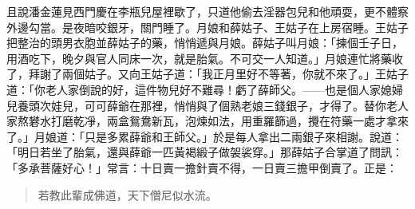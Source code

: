 且說潘金蓮見西門慶在李瓶兒屋裡歇了，只道他偷去淫器包兒和他頑耍，更不體察外邊勾當。是夜暗咬銀牙，關門睡了。月娘和薛姑子、王姑子在上房宿睡。王姑子把整治的頭男衣胞並薛姑子的藥，悄悄遞與月娘。薛姑子叫月娘：「揀個壬子日，用酒吃下，晚夕與官人同床一次，就是胎氣。不可交一人知道。」月娘連忙將藥收了，拜謝了兩個姑子。又向王姑子道：「我正月里好不等著，你就不來了。」王姑子道：「你老人家倒說的好，這件物兒好不難尋！虧了薛師父。——也是個人家媳婦兒養頭次娃兒，可可薛爺在那裡，悄悄與了個熟老娘三錢銀子，才得了。替你老人家熬礬水打磨乾凈，兩盒鴛鴦新瓦，泡煉如法，用重羅篩過，攪在符藥一處才拿來了。」月娘道：「只是多累薛爺和王師父。」於是每人拿出二兩銀子來相謝。說道：「明日若坐了胎氣，還與薛爺一匹黃褐緞子做袈裟穿。」那薛姑子合掌道了問訊：「多承菩薩好心！」常言：十日賣一擔針賣不得，一日賣三擔甲倒賣了。正是：
\begin{quote}
若教此輩成佛道，天下僧尼似水流。
\end{quote}
